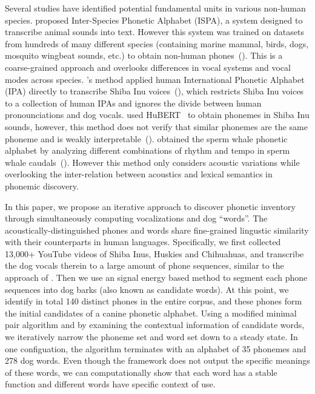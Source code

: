 Several studies have identified potential fundamental units in various non-human species. \citet{hagiwara2024ispa} proposed Inter-Species Phonetic Alphabet (ISPA), a system designed to transcribe animal sounds into text.
However this system was trained on datasets from hundreds of many different species (containing marine mammal, birds, dogs, mosquito wingbeat sounds, etc.) to obtain non-human phones~(). This is a coarse-grained approach and overlooks differences in vocal systems and vocal modes across species.
\citet{huang2023transcribing}'s method applied human International Phonetic Alphabet (IPA) directly to transcribe Shiba Inu voices~(), which restricts Shiba Inu voices to a collection of human IPAs and ignores the divide between human pronounciations and dog vocals.
\citet{li2024phonetic} used HuBERT~\citep{hsu2021hubert} to obtain phonemes in Shiba Inu sounds, however, this method does not verify that similar phonemes are the same phoneme and is weakly interpretable~().
\citet{sharma2024contextual} obtained the sperm whale phonetic alphabet by analyzing different combinations of rhythm and tempo in sperm whale caudals~(). However this method only considers acoustic variations while overlooking the inter-relation between acoustics and lexical semantics in phonemic discovery.

In this paper, we propose an iterative approach to discover phonetic inventory through simultaneously computing vocalizations and dog ``words''. The acoustically-distinguished phones and words share fine-grained lingustic similarity with 
their counterparts in human languages. Specifically,  we first collected 13,000+ YouTube videos of
Shiba Inus, Huskies and Chihuahuas, and transcribe the dog vocals therein to a large amount 
of phone sequences, similar to the approach of \citet{li2024phonetic}. Then we use an
signal energy based method to segment each phone sequences into dog barks (also known as
candidate words). At this point, we identify in total 140 distinct phones in the 
entire corpus, and these phones form the initial candidates of a canine phonetic alphabet. 
Using a modified minimal pair algorithm and by examining the contextual information of
candidate words, we iteratively narrow the phoneme set and word set down to a
steady state. In one configuation, the algorithm terminates with an alphabet of 35 phonemes
and 278 dog words. Even though the framework does not output the specific
meanings of these words, we can computationally show that each word has a stable function and
different words have specific context of use.

